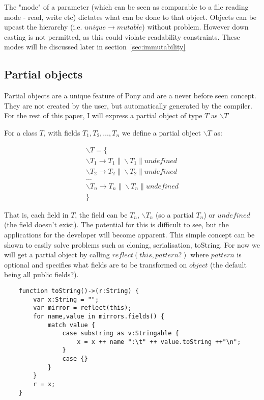 \documentclass{article}
\begin{document}
The "mode" of a parameter (which can be seen as comparable to a file reading mode - read, write etc) dictates what can be done to that object. Objects can be upcast the hierarchy (i.e. $unique \to mutable$) without problem. However down casting is not permitted, as this could violate readability constraints. These modes will be discussed later in section~\ref{sec:immutability}


\subsection{Partial objects}

Partial objects are a unique feature of Pony and are a never before seen concept. They are not created by the user, but automatically generated by the compiler. For the rest of this paper, I will express a partial object of type $\displaystyle T$ as $\displaystyle\backslash T$

For a class $\displaystyle T$, with fields $\displaystyle T_{1}, T_{2}, \dots , T_{n}$ we define a partial object $\displaystyle\backslash T$ as:

\begin{align*}
\backslash T  = \{\\
	\backslash T_{1} \to T_{1} \| \backslash T_{1} \| undefined\\
	\backslash T_{2} \to T_{2} \| \backslash T_{2} \| undefined\\
	\dots\\
	\backslash T_{n} \to T_{n} \| \backslash T_{n} \| undefined\\
\}
\end{align*}

That is, each field in $T$, the field can be $T_{n}$, $\backslash T_{n}$ (so a partial $T_{n}$) or $undefined$ (the field doesn't exist). The potential for this is difficult to see, but the applications for the developer will become apparent. This simple concept can be shown to easily solve problems such as cloning, serialisation, toString. For now we will get a partial object by calling $reflect(this,pattern?)$ where $pattern$ is optional and specifies what fields are to be transformed on $object$ (the default being all public fields?).

\begin{verbatim}
    function toString()->(r:String) {
        var x:String = "";
        var mirror = reflect(this);
        for name,value in mirrors.fields() {
            match value {
                case substring as v:Stringable {
                    x = x ++ name ":\t" ++ value.toString ++"\n";
                }
                case {}
            }
        }
        r = x;
    }
\end{verbatim}
\end{document}

